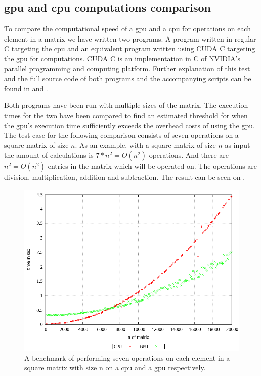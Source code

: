 \subsection{\acrshort{gpu} and \acrshort{cpu} computations comparison}\label{sub:gpubenchmark}
To compare the computational speed of a \acrshort{gpu} and a \acrshort{cpu} for operations on each element in a matrix we have written two programs.
A program written in regular C targeting the \acrshort{cpu} and an equivalent program written using CUDA C targeting the \acrshort{gpu} for computations.
CUDA C is an implementation in C of NVIDIA's parallel programming and computing platform.
Further explanation of this test and the full source code of both programs and the accompanying scripts can be found in  and .

Both programs have been run with multiple sizes of the matrix.
The execution times for the two have been compared to find an estimated threshold for when the \acrshort{gpu}'s execution time sufficiently exceeds the overhead costs of using the \acrshort{gpu}.
The test case for the following comparison consists of seven operations on a square matrix of size $n$.
As an example, with a square matrix of size $n$ as input the amount of calculations is $7*n^2 = O(n^2)$ operations. 
And there are $n^2 = O(n^2)$ entries in the matrix which will be operated on.
The operations are division, multiplication, addition and subtraction.
The result can be seen on .
\begin{figure}[h!]
\centering
 \includegraphics[width=1\textwidth]{figures/benchmark.png} %
\caption{A benchmark of performing seven operations on each element in a square matrix with size n on a \acrshort{cpu} and a \acrshort{gpu} respectively.}\label{image:benchmark}
\vspace{-15pt}
\end{figure}

